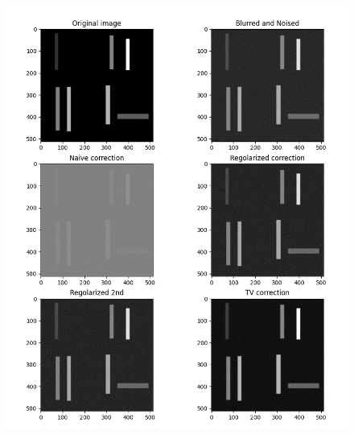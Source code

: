 \documentclass[12pt]{article}
\begin{document}
    \begin{figure}[h!]
    \centering
    \includegraphics[width=14cm]{sample2}
    \end{figure}
    \newpage
\end{document}
